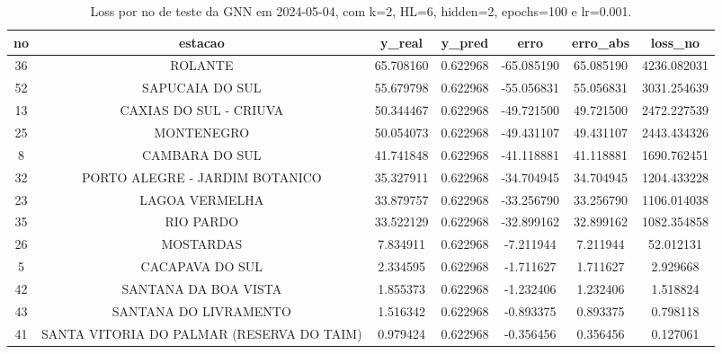 \begin{table}[h]
\centering
\caption{Loss por no de teste da GNN em 2024-05-04, com k=2, HL=6, hidden=2, epochs=100 e lr=0.001.}
\label{tab:gnn_loss_k2_hl6_h2_e100_d20240504}
\begin{tabular}{ccccccc}
\toprule
no & estacao & y\_real & y\_pred & erro & erro\_abs & loss\_no \\
\midrule
36 & ROLANTE & 65.708160 & 0.622968 & -65.085190 & 65.085190 & 4236.082031 \\
52 & SAPUCAIA DO SUL & 55.679798 & 0.622968 & -55.056831 & 55.056831 & 3031.254639 \\
13 & CAXIAS DO SUL - CRIUVA & 50.344467 & 0.622968 & -49.721500 & 49.721500 & 2472.227539 \\
25 & MONTENEGRO & 50.054073 & 0.622968 & -49.431107 & 49.431107 & 2443.434326 \\
8 & CAMBARA DO SUL & 41.741848 & 0.622968 & -41.118881 & 41.118881 & 1690.762451 \\
32 & PORTO ALEGRE - JARDIM BOTANICO & 35.327911 & 0.622968 & -34.704945 & 34.704945 & 1204.433228 \\
23 & LAGOA VERMELHA & 33.879757 & 0.622968 & -33.256790 & 33.256790 & 1106.014038 \\
35 & RIO PARDO & 33.522129 & 0.622968 & -32.899162 & 32.899162 & 1082.354858 \\
26 & MOSTARDAS & 7.834911 & 0.622968 & -7.211944 & 7.211944 & 52.012131 \\
5 & CACAPAVA DO SUL & 2.334595 & 0.622968 & -1.711627 & 1.711627 & 2.929668 \\
42 & SANTANA DA BOA VISTA & 1.855373 & 0.622968 & -1.232406 & 1.232406 & 1.518824 \\
43 & SANTANA DO LIVRAMENTO & 1.516342 & 0.622968 & -0.893375 & 0.893375 & 0.798118 \\
41 & SANTA VITORIA DO PALMAR (RESERVA DO TAIM) & 0.979424 & 0.622968 & -0.356456 & 0.356456 & 0.127061 \\
\bottomrule
\end{tabular}
\end{table}
